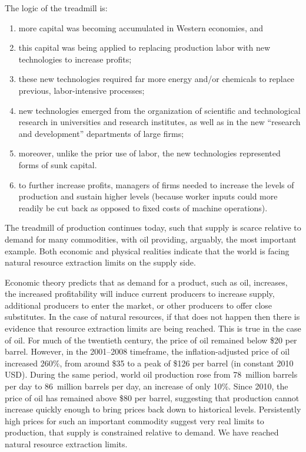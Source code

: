 The logic of the treadmill is:
\begin{enumerate}
	\item more capital was becoming accumulated in Western economies, and 
	\item this capital was being applied to replacing production labor 
				with new technologies to increase profits; 
	\item these new technologies required far more energy and/or chemicals 
				to replace previous, labor-intensive processes;
	\item new technologies emerged from the organization of scientific and 
				technological research in universities and research institutes, 
				as well as in the new ``research and development'' departments of large firms;
	\item moreover, unlike the prior use of labor, 
				the new technologies represented forms of sunk capital. 
	\item to further increase profits, managers of firms needed 
				to increase the levels of production 
				and sustain higher levels (because worker inputs could more readily be cut back 
				as opposed to fixed costs of machine operations).\cite[p.296]{Gould2004}
\end{enumerate}

The treadmill of production continues today, 
such that supply is scarce relative to demand for many commodities, 
with oil providing, arguably, the most important example. 
Both economic and physical realities indicate that the world is facing
natural resource extraction limits on the supply side.

Economic theory predicts that as demand for a product, such as oil, increases,
the increased profitability will induce current producers to increase supply, 
additional producers to enter the market,
or other producers to offer close substitutes. 
In the case of natural resources, if that does not happen
then there is evidence that resource extraction limits are being reached.
This is true in the case of oil.
For much of the twentieth century, the price of oil remained below \$20 per barrel.
However, in the 2001--2008 timeframe,
the inflation-adjusted price of oil increased 260\%,
from around \$35 to a peak of \$126 per barrel 
(in constant 2010 USD).
During the same period,
world oil production rose from 
78~million barrels per day to 86~million barrels per day,
an increase of only 10\%.\cite{EIA2014}
Since 2010, the price of oil has remained above \$80 per barrel,
suggesting that production cannot increase quickly enough to bring prices
back down to historical levels.
Persistently high prices for such an important commodity
suggest very real limits to production, 
that supply is constrained relative to demand. 
We have reached natural resource extraction limits.

